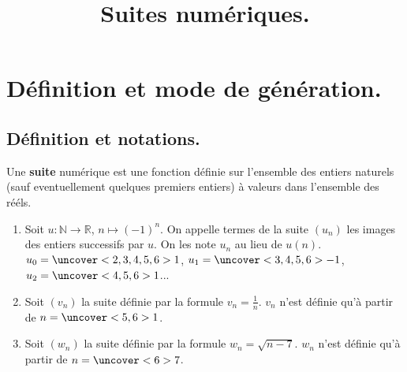 \documentclass{beamer}
\date{}
\title{Suites numériques.}
\begin{document}
  
  \begin{frame}
    
    \titlepage
    
  \end{frame}
  
  \section{Définition et mode de génération.}
  
  \subsection{Définition et notations.}
 
  \begin{frame}
  
  \begin{definition}
  Une \textbf{suite} numérique est une fonction définie sur l'ensemble 
  des entiers naturels (sauf eventuellement quelques premiers entiers) à valeurs dans l'ensemble
  des rééls. 
  \end{definition}
  
  \end{frame}
  
  \begin{frame}
   \begin{example} \label{exsuite}
   \begin{enumerate}
    \item Soit $u:\mathbb{N} \to \mathbb{R}$, $n \mapsto (-1)^n$. On appelle termes de la suite $(u_n)$ les images 
    des entiers successifs par $u$.
   On les note $u_n$ au lieu de $u(n)$. $u_0=\uncover<2,3,4,5,6>{1}$, 
   $u_1=\uncover<3,4,5,6>{-1}$, $u_2=\uncover<4,5,6>{1}$...
   \item Soit $(v_n)$ la suite définie par la formule $v_n=\frac{1}{n}$. $v_n$ n'est 
   définie qu'à partir de $n=\uncover<5,6>{1}$.
   \item Soit $(w_n)$ la suite définie par la formule $w_n=\sqrt{n-7}$. $w_n$ 
   n'est définie qu'à partir de $n=\uncover<6>{7}$.
   \end{enumerate}

  \end{example}
  
  \end{frame}
  
\end{document}
